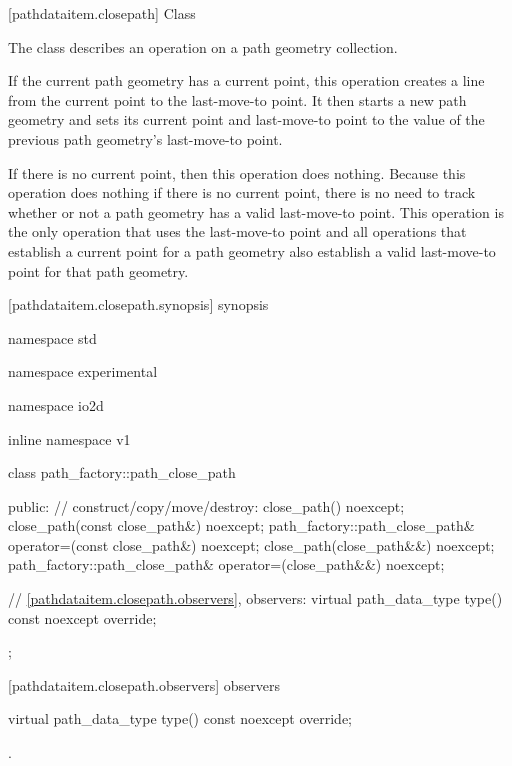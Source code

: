  [pathdataitem.closepath] {Class }

\pnum
{}
The class  describes an operation on a path geometry collection.

\pnum
If the current path geometry has a current point, this operation creates a line from the current point to the last-move-to point. It then starts a new path geometry and sets its current point and last-move-to point to the value of the previous path geometry's last-move-to point.

\pnum
If there is no current point, then this operation does nothing.
\enternote
Because this operation does nothing if there is no current point, there is no need to track whether or not a path geometry has a valid last-move-to point. This operation is the only operation that uses the last-move-to point and all operations that establish a current point for a path geometry also establish a valid last-move-to point for that path geometry.
\exitnote

 [pathdataitem.closepath.synopsis] { synopsis}

\begin{codeblock}
namespace std { namespace experimental { namespace io2d { inline namespace v1 {
  class path_factory::path_close_path {
  public:
    // construct/copy/move/destroy:
    close_path() noexcept;
    close_path(const close_path&) noexcept;
    path_factory::path_close_path& operator=(const close_path&) noexcept;
    close_path(close_path&&) noexcept;
    path_factory::path_close_path& operator=(close_path&&) noexcept;

    // \ref{pathdataitem.closepath.observers}, observers:
    virtual path_data_type type() const noexcept override;
  };
} } } }
\end{codeblock}

 [pathdataitem.closepath.observers]{ observers}

\begin{itemdecl}
    virtual path_data_type type() const noexcept override;
\end{itemdecl}
\begin{itemdescr}
	\pnum
	\returns
	.
\end{itemdescr}

